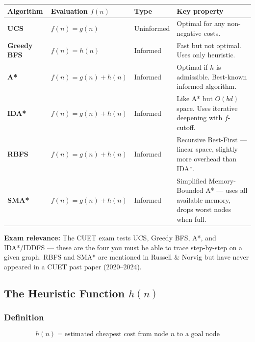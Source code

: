 \documentclass[12pt, a4paper]{article}
\newenvironment{notesbox}{\begin{mdframed}[style=notesframe]}{\end{mdframed}}
\begin{document}
\begin{center}
\renewcommand{\arraystretch}{1.5}
\begin{tabular}{l|l|l|l}
\toprule
\textbf{Algorithm} & \textbf{Evaluation $f(n)$} & \textbf{Type} & \textbf{Key property} \\
\midrule
\textbf{UCS} &
  $f(n) = g(n)$ &
  Uninformed &
  Optimal for any non-negative costs. \\
\textbf{Greedy BFS} &
  $f(n) = h(n)$ &
  Informed &
  Fast but not optimal. Uses only heuristic. \\
\textbf{A*} &
  $f(n) = g(n) + h(n)$ &
  Informed &
  Optimal if $h$ is admissible. Best-known informed algorithm. \\
\textbf{IDA*} &
  $f(n) = g(n) + h(n)$ &
  Informed &
  Like A* but $O(bd)$ space. Uses iterative deepening with $f$-cutoff. \\
\textbf{RBFS} &
  $f(n) = g(n) + h(n)$ &
  Informed &
  Recursive Best-First — linear space, slightly more overhead than IDA*. \\
\textbf{SMA*} &
  $f(n) = g(n) + h(n)$ &
  Informed &
  Simplified Memory-Bounded A* — uses all available memory, drops worst nodes when full. \\
\bottomrule
\end{tabular}
\end{center}

\begin{notesbox}
\textbf{Exam relevance:} The CUET exam tests UCS, Greedy BFS, A*, and IDA*/IDDFS — these are the four you must be able to trace step-by-step on a given graph. RBFS and SMA* are mentioned in Russell \& Norvig but have never appeared in a CUET past paper (2020--2024).
\end{notesbox}

\subsection{The Heuristic Function $h(n)$}

\subsubsection*{Definition}

\[
\boxed{h(n) = \text{estimated cheapest cost from node } n \text{ to a goal node}}
\]
\end{document}
